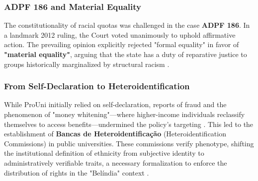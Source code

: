 \subsubsection{ADPF 186 and Material Equality}
The constitutionality of racial quotas was challenged in the case \textbf{ADPF 186}. In a landmark 2012 ruling, the Court voted unanimously to uphold affirmative action. The prevailing opinion explicitly rejected "formal equality" in favor of \textbf{"material equality"}, arguing that the state has a duty of reparative justice to groups historically marginalized by structural racism \cite{STF2012}.

\subsubsection{From Self-Declaration to Heteroidentification}
While ProUni initially relied on self-declaration, reports of fraud and the phenomenon of "money whitening"—where higher-income individuals reclassify themselves to access benefits—undermined the policy's targeting \cite{Telles2004}. This led to the establishment of \textbf{Bancas de Heteroidentificação} (Heteroidentification Commissions) in public universities. These commissions verify phenotype, shifting the institutional definition of ethnicity from subjective identity to administratively verifiable traits, a necessary formalization to enforce the distribution of rights in the "Belíndia" context \cite{RiehlMachadoReyes2023}.